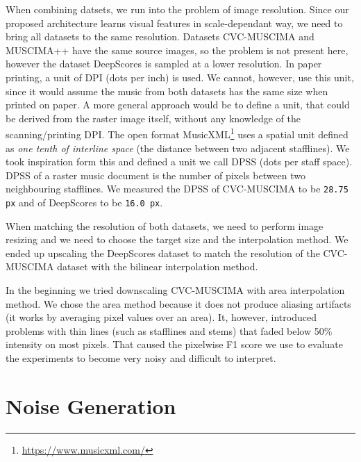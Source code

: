 
When combining datsets, we run into the problem of image resolution. Since our proposed architecture learns visual features in scale-dependant way, we need to bring all datasets to the same resolution. Datasets CVC-MUSCIMA and MUSCIMA++ have the same source images, so the problem is not present here, however the dataset DeepScores is sampled at a lower resolution. In paper printing, a unit of DPI (dots per inch) is used. We cannot, however, use this unit, since it would assume the music from both datasets has the same size when printed on paper. A more general approach would be to define a unit, that could be derived from the raster image itself, without any knowledge of the scanning/printing DPI. The open format MusicXML\footnote{\url{https://www.musicxml.com/}} uses a spatial unit defined as \emph{one tenth of interline space} (the distance between two adjacent stafflines). We took inspiration form this and defined a unit we call DPSS (dots per staff space). DPSS of a raster music document is the number of pixels between two neighbouring stafflines. We measured the DPSS of CVC-MUSCIMA to be \verb`28.75 px` and of DeepScores to be \verb`16.0 px`.


When matching the resolution of both datasets, we need to perform image resizing and we need to choose the target size and the interpolation method. We ended up upscaling the DeepScores dataset to match the resolution of the CVC-MUSCIMA dataset with the bilinear interpolation method.

In the beginning we tried downscaling CVC-MUSCIMA with area interpolation method. We chose the area method because it does not produce aliasing artifacts (it works by averaging pixel values over an area). It, however, introduced problems with thin lines (such as stafflines and stems) that faded below 50\% intensity on most pixels. That caused the pixelwise F1 score we use to evaluate the experiments to become very noisy and difficult to interpret.


\section{Noise Generation}
\label{sec:NoiseGeneration}



